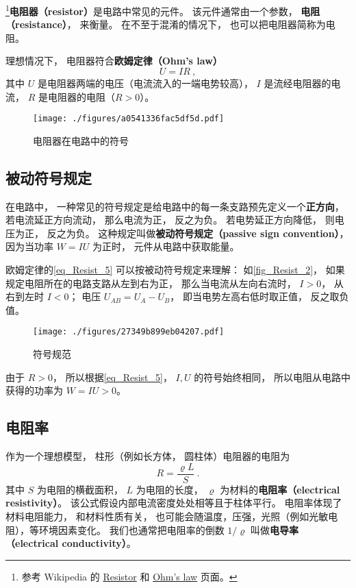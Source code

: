 

\footnote{参考 Wikipedia 的 \href{https://en.wikipedia.org/wiki/Resistor}{Resistor} 和 \href{https://en.wikipedia.org/wiki/Ohm's_law}{Ohm's law} 页面。}\textbf{电阻器（resistor）}是电路中常见的元件。 该元件通常由一个参数， \textbf{电阻（resistance）}， 来衡量。 在不至于混淆的情况下， 也可以把电阻器简称为电阻。

理想情况下， 电阻器符合\textbf{欧姆定律（Ohm's law）}
\begin{equation}\label{eq_Resist_5}
U = IR~,
\end{equation}
其中 $U$ 是电阻器两端的电压（电流流入的一端电势较高）， $I$ 是流经电阻器的电流， $R$ 是电阻器的电阻（$R > 0$）。

\begin{figure}[ht]
\centering
\texttt{[image: ./figures/a0541336fac5df5d.pdf]}
\caption{电阻器在电路中的符号} \label{fig_Resist_3}
\end{figure}

\subsection{被动符号规定}\label{sub_Resist_1}
在电路中， 一种常见的符号规定是给电路中的每一条支路预先定义一个\textbf{正方向}， 若电流延正方向流动， 那么电流为正， 反之为负。 若电势延正方向降低， 则电压为正， 反之为负。 这种规定叫做\textbf{被动符号规定（passive sign convention）}， 因为当功率 $W = IU$ 为正时， 元件从电路中获取能量。

欧姆定律的\autoref{eq_Resist_5} 可以按被动符号规定来理解： 如\autoref{fig_Resist_2}， 如果规定电阻所在的电路支路从左到右为正， 那么当电流从左向右流时， $I > 0$， 从右到左时 $I < 0$； 电压 $U_{AB} = U_A - U_B$， 即当电势左高右低时取正值， 反之取负值。

\begin{figure}[ht]
\centering
\texttt{[image: ./figures/27349b899eb04207.pdf]}
\caption{符号规范} \label{fig_Resist_2}
\end{figure}

由于 $R > 0$， 所以根据\autoref{eq_Resist_5}， $I, U$ 的符号始终相同， 所以电阻从电路中获得的功率为 $W = IU > 0$。

\subsection{电阻率}
作为一个理想模型， 柱形（例如长方体， 圆柱体）电阻器的电阻为
\begin{equation}
R = \frac{\varrho L}{S} ~.
\end{equation}
其中 $S$ 为电阻的横截面积， $L$ 为电阻的长度， $\varrho$ 为材料的\textbf{电阻率（electrical resistivity）}。 该公式假设内部电流密度处处相等且于柱体平行。 电阻率体现了材料电阻能力， 和材料性质有关， 也可能会随温度，压强，光照（例如光敏电阻），等环境因素变化。 我们也通常把电阻率的倒数 $1/\varrho$ 叫做\textbf{电导率（electrical conductivity）}。

